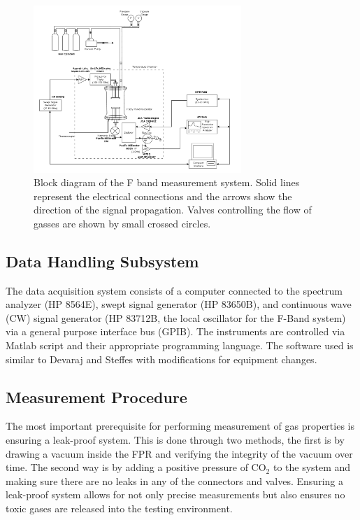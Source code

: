 \begin{figure}[H]
    \centering
	\includegraphics[width=0.7\textwidth]{./images/f-bandsystem.png}
	\caption{Block diagram of the F band measurement system. Solid lines represent the electrical connections and the arrows show the direction of the signal propagation. Valves controlling the flow of gasses are shown by small crossed circles.  }
    \label{fig:fbandimage}
\end{figure}

\subsection{Data Handling Subsystem}

The data acquisition system consists of a computer connected to the spectrum analyzer (HP 8564E), swept signal generator (HP 83650B), and continuous wave (CW) signal generator (HP 83712B, the local oscillator for the F-Band system) via a general purpose interface bus (GPIB). The instruments are controlled via Matlab script and their appropriate programming language. The software used is similar to Devaraj and Steffes \cite{system-description} \cite{Devaraj-thesis} with modifications for equipment changes.

\subsection{Measurement Procedure}

The most important prerequisite for performing measurement of gas properties is ensuring a leak-proof system. This is done through two methods, the first is by drawing a vacuum inside the FPR and verifying the integrity of the vacuum over time. The second way is by adding a positive pressure of CO$_2$ to the system and making sure there are no leaks in any of the connectors and valves. Ensuring a leak-proof system allows for not only precise measurements but also ensures no toxic gases are released into the testing environment.


